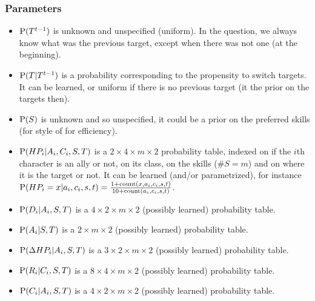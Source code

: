 

\subsubsection{Parameters}

\begin{itemize}
    \item $\mathrm{P}(T^{t-1})$ is unknown and unspecified (uniform). In the question, we always know what was the previous target, except when there was not one (at the beginning).
    \item $\mathrm{P}(T|T^{t-1})$ is a probability corresponding to the propensity to switch targets. It can be learned, or uniform if there is no previous target (it the prior on the targets then).
    \item $\mathrm{P}(S)$ is unknown and so unspecified, it could be a prior on the preferred skills (for style of for efficiency).
    \item $\mathrm{P}(HP_i | A_i, C_i, S, T)$ is a $2\times4\times m \times 2$ probability table, indexed on if the $i$th character is an ally or not, on its class, on the skills ($\#S=m$) and on where it is the target or not. It can be learned (and/or parametrized), for instance $\mathrm{P}(HP_i=x|a_i,c_i,s,t)=\frac{1+\mathrm{count}(x,a_i,c_i,s,t)}{10+\mathrm{count}(a_i,c_i,s,t)}$.
    \item $\mathrm{P}(D_i | A_i, S, T)$ is a $4\times2 \times m \times 2$ (possibly learned) probability table.
    \item $\mathrm{P}(A_i | S, T)$ is a $2 \times m \times 2$ (possibly learned) probability table.
    \item $\mathrm{P}(\Delta HP_i | A_i, S, T)$ is a $3 \times 2 \times m \times 2$ (possibly learned) probability table.
    \item $\mathrm{P}(R_i | C_i, S, T)$ is a $8 \times 4 \times m \times 2$ (possibly learned) probability table.
    \item $\mathrm{P}(C_i | A_i, S, T)$ is a $4 \times 2 \times m \times 2$ (possibly learned) probability table.
\end{itemize}

